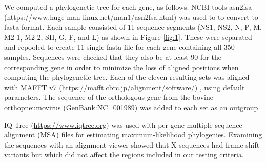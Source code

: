\documentclass{article}
\begin{document}
We computed a phylogenetic tree for each gene, as follows.
NCBI-tools asn2fsa (\url{https://www.huge-man-linux.net/man1/asn2fsa.html}) was used to to convert to fasta format.
Each sample consisted of 11 sequence segments
(NS1, NS2, N, P, M, M2-1, M2-2, SH, G, F, and L) as shown in 
Figure \ref{fig:1}.
These were separated and repooled to create 11 single fasta file for each gene containing all 350 samples. 
Sequences were checked that they also be at least 90%
for the corresponding gene in order to minimize the loss of aligned positions when computing the phylogenetic tree. 
Each of the eleven resulting sets was aligned with MAFFT v7 (\url{https://mafft.cbrc.jp/alignment/software/})
\cite{katoh2013mafft},
using default  parameters.
The sequence of the orthologous gene from the bovine orthopneumovirus 
(\href{https://www.ncbi.nlm.nih.gov/nuccore/NC_001989}{GenBank:NC\_001989}) 
was added to each set as an outgroup. 

IQ-Tree 
(\url{https://www.iqtree.org})
\cite{nguyen2015iq}
was used with per-gene multiple sequence alignment (MSA) files for estimating maximum-likelihood phylogenies.
Examining the sequences with an alignment viewer showed that X sequences 
had frame shift variants but which did not affect the regions included in our testing criteria.
\end{document}
